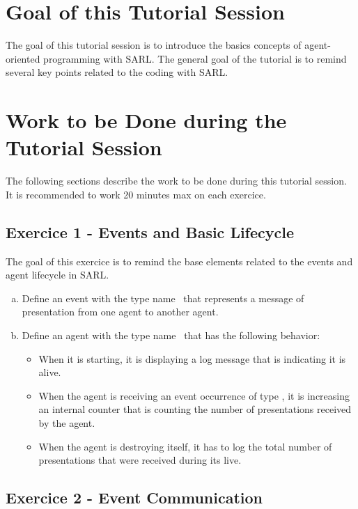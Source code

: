 \documentclass[english,nodocumentinfo,nopubpage]{utbmciadreport}
\begin{document}
\section{Goal of this Tutorial Session}

The goal of this tutorial session is to introduce the basics concepts of agent-oriented programming with SARL.
The general goal of the tutorial is to remind several key points related to the coding with SARL.

\section{Work to be Done during the Tutorial Session}

The following sections describe the work to be done during this tutorial session. It is recommended to work 20 minutes max on each exercice.

\subsection{Exercice 1 - Events and Basic Lifecycle}

The goal of this exercice is to remind the base elements related to the events and agent lifecycle in SARL.

\begin{enumerate}[a)]
\item Define an event with the type name \ that represents a message of presentation from one agent to another agent.
\item Define an agent with the type name \ that has the following behavior:
	\begin{itemize}
	\item When it is starting, it is displaying a log message that is indicating it is alive.
	\item When the agent is receiving an event occurrence of type , it is increasing an internal counter that is counting the number of presentations received by the agent.
	\item When the agent is destroying itself, it has to log the total number of presentations that were received during its live.
	\end{itemize}
\end{enumerate}


\subsection{Exercice 2 - Event Communication}
\end{document}
